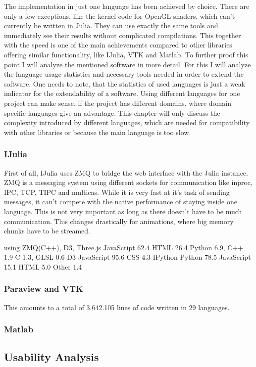 The implementation in just one language has been achieved by choice. There are only a few exceptions, like the kernel code for OpenGL shaders, which can't currently be written in Julia. 
They can use exactly the same tools and immediately see their results without complicated compilations.
This together with the speed is one of the main achievements compared to other libraries offering similar functionality, like IJulia, VTK and Matlab.
To further proof this point I will analyze the mentioned software in more detail.
For this I will analyze the language usage statistics and necessary tools needed in order to extend the software.
One needs to note, that the statistics of used languages is just a weak indicator for the extendability of a software.
Using different languages for one project can make sense, if the project has different domains, where domain specific languages give an advantage.
This chapter will only discuss the complexity introduced by different languages, which are needed for compatibility with other libraries or because the main language is too slow.

\subsubsection{IJulia}
First of all, IJulia uses ZMQ to bridge the web interface with the Julia instance.
ZMQ is a messaging system using different sockets for communication like inproc, IPC, TCP, TIPC and multicas.
While it is very fast at it's task of sending messages, it can't compete with the native performance of staying inside one language.
This is not very important as long as there doesn't have to be much communication. This changes drastically for animations, where big memory chunks have to be streamed.

using ZMQ(C++), D3, 
Three.js
JavaScript 62.4	 HTML 26.4	 Python 6.9,	 C++ 1.9	 C 1.3,	 GLSL 0.6
D3
JavaScript 95.6	 CSS 4.3
IPython
Python 78.5	 JavaScript 15.1	 HTML 5.0	 Other 1.4

\subsubsection{Paraview and VTK}



This amounts to a total of 3.642.105 lines of code written in 29 languages.

\subsubsection{Matlab}



\subsection{Usability Analysis}
